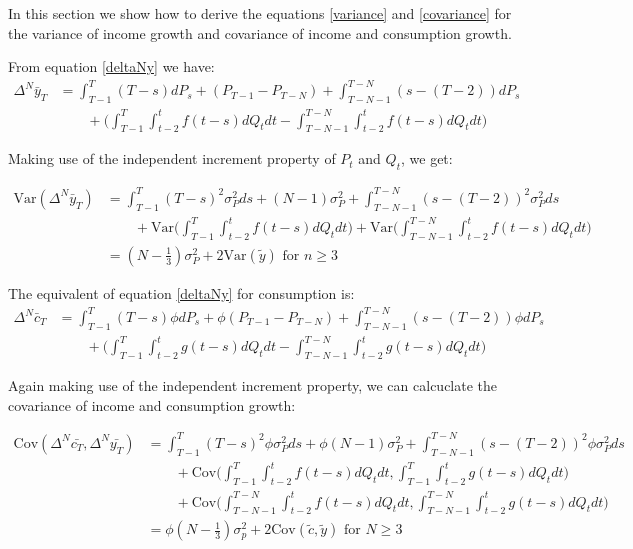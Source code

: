 
In this section we show how to derive the equations \ref{variance} and \ref{covariance} for the variance of income growth and covariance of income and consumption growth.

From equation \ref{deltaNy} we have:
\begin{align}
\Delta^N \bar{y}_T &= \int_{T-1}^{T} (T-s)dP_s  + (P_{T-1} - P_{T-N}) + \int_{T-N-1}^{T-N} (s-(T-2))dP_s \nonumber \\
& \qquad + \Big(\int_{T-1}^{T} \int_{t-2}^{t} f(t-s)dQ_t dt -\int_{T-N-1}^{T-N}\int_{t-2}^{t} f(t-s) dQ_t dt \Big) 
\end{align}

Making use of the independent increment property of $P_t$ and $Q_t$, we get:

\begin{align}
\mathrm{Var}(\Delta^N \bar{y}_T) &= \int_{T-1}^{T} (T-s)^2 \sigma^2_P ds + (N-1)\sigma^2_P + 
\int_{T-N-1}^{T-N} (s-(T-2)) ^2 \sigma^2_Pds \nonumber \\
&  \qquad + \mathrm{Var}\Big(\int_{T-1}^{T} \int_{t-2}^{t} f(t-s)dQ_t dt \Big) + \mathrm{Var}\Big(\int_{T-N-1}^{T-N}\int_{t-2}^{t} f(t-s) dQ_t dt \Big) \nonumber \\ 
&= (N-\frac{1}{3})\sigma^2_P +  2 \mathrm{Var}(\tilde{y}) \text{   for }n \geq 3 \label{variance}
\end{align}

The equivalent of equation \ref{deltaNy} for consumption is:
\begin{align}
\Delta^N \bar{c}_T &= \int_{T-1}^{T} (T-s)\phi dP_s  + \phi (P_{T-1} - P_{T-N}) + \int_{T-N-1}^{T-N} (s-(T-2)) \phi dP_s \nonumber \\
& \qquad + \Big(\int_{T-1}^{T} \int_{t-2}^{t} g(t-s)dQ_t dt -\int_{T-N-1}^{T-N}\int_{t-2}^{t} g(t-s) dQ_t dt \Big) 
\end{align}

Again making use of the independent increment property, we can calcuclate the covariance of income and consumption growth:

\begin{align}
\mathrm{Cov}(\Delta^N \bar{c_T},\Delta^N \bar{y_T} ) &= \int_{T-1}^{T} (T-s)^2 \phi \sigma^2_P ds + \phi (N-1)\sigma^2_P + 
\int_{T-N-1}^{T-N} (s-(T-2)) ^2 \phi \sigma^2_Pds \nonumber \\
&  \qquad + \mathrm{Cov}\Big(\int_{T-1}^{T} \int_{t-2}^{t} f(t-s)dQ_t dt, \int_{T-1}^{T} \int_{t-2}^{t} g(t-s)dQ_t dt \Big)  \nonumber \\
&  \qquad + \mathrm{Cov}\Big(\int_{T-N-1}^{T-N}\int_{t-2}^{t} f(t-s) dQ_t dt , \int_{T-N-1}^{T-N}\int_{t-2}^{t} g(t-s) dQ_t dt\Big) \nonumber \\ 
&= \phi (N-\frac{1}{3}) \sigma^2_p + 2 \mathrm{Cov}(\tilde{c},\tilde{y}) \text{  for  } N\geq 3 \label{covariance}
\end{align}

